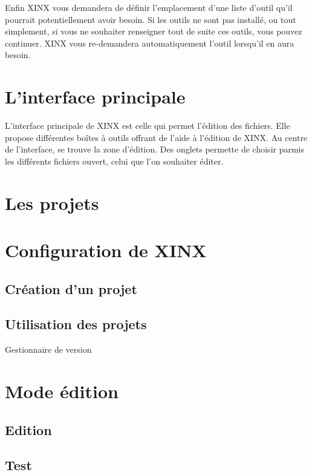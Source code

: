 \documentclass[a4paper,10pt,twoside]{book}
\begin{document}
Enfin XINX vous demandera de définir l'emplacement d'une liste d'outil qu'il pourrait potentiellement avoir besoin. Si les outils ne sont pas installé, ou tout simplement, si vous ne souhaiter renseigner tout de suite ces outils, vous pouvez continuer. XINX vous re-demandera automatiquement l'outil lorsqu'il en aura besoin.

\section{L'interface principale}

L'interface principale de XINX est celle qui permet l'édition des fichiers. Elle propose différentes boîtes à outils offrant de l'aide à l'édition de XINX. Au centre de l'interface, se trouve la zone d'édition. Des onglets permette de choisir parmis les différents fichiers ouvert, celui que l'on souhaiter éditer.



\section{Les projets}

\section{Configuration de XINX}

\subsection{Création d'un projet}

\subsection{Utilisation des projets}
\label{sec:RCS}
Gestionnaire de version

\section{Mode édition}

\subsection{Edition}

\subsection{Test}
\end{document}
